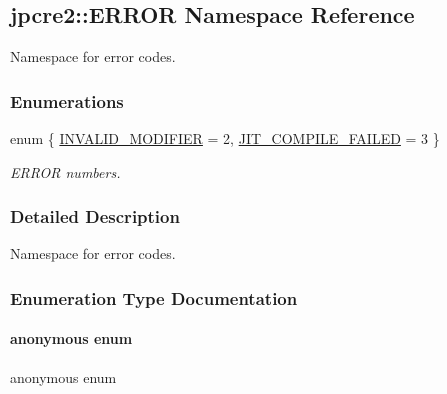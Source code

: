 \hypertarget{namespacejpcre2_1_1ERROR}{}\subsection{jpcre2\+:\+:E\+R\+R\+OR Namespace Reference}
\label{namespacejpcre2_1_1ERROR}


Namespace for error codes.  


\subsubsection*{Enumerations}
\begin{DoxyCompactItemize}
\item 
enum \{ \newline
\hyperlink{namespacejpcre2_1_1ERROR_a4b2998984439438fa9da8d7043909bc2_a4b2998984439438fa9da8d7043909bc2a4115340549b623f4e2da285bf0aa9bff}{I\+N\+V\+A\+L\+I\+D\+\_\+\+M\+O\+D\+I\+F\+I\+ER} = 2, 
\newline
\hyperlink{namespacejpcre2_1_1ERROR_a4b2998984439438fa9da8d7043909bc2_a4b2998984439438fa9da8d7043909bc2aa116db5c7b638480ccad3ae938d33c3e}{J\+I\+T\+\_\+\+C\+O\+M\+P\+I\+L\+E\+\_\+\+F\+A\+I\+L\+ED} = 3
 \}\begin{DoxyCompactList}\small\item\em E\+R\+R\+OR numbers. \end{DoxyCompactList}
\end{DoxyCompactItemize}


\subsubsection{Detailed Description}
Namespace for error codes. 



\subsubsection{Enumeration Type Documentation}
\hypertarget{namespacejpcre2_1_1ERROR_a4b2998984439438fa9da8d7043909bc2_a4b2998984439438fa9da8d7043909bc2}{}\label{namespacejpcre2_1_1ERROR_a4b2998984439438fa9da8d7043909bc2_a4b2998984439438fa9da8d7043909bc2} 
\paragraph{\texorpdfstring{anonymous enum}{anonymous enum}}
{\footnotesize\ttfamily anonymous enum}



